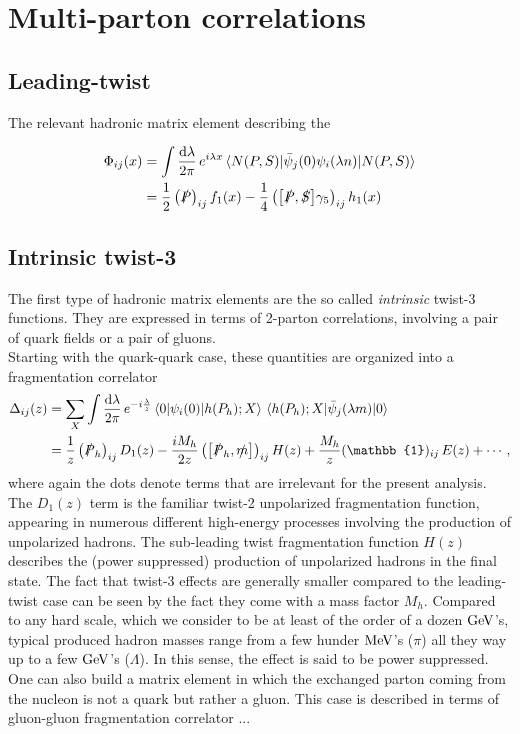 \section{Multi-parton correlations}

\subsection{Leading-twist }
The relevant hadronic matrix element describing the 


\begin{equation}
    \begin{aligned}
        \Phi_{ij}(x)&= \int\frac{\dd \lambda}{2\pi} \,e^{i\lambda x}\mel{N(P,S)}{\bar \psi_j(0) \psi_i(\lambda n)}{N(P,S)}\\
        &= \frac{1}{2}\left(\slashed{P}\right)_{ij} f_1(x)
        -\frac{1}{4} \left(\comm{\slashed{P}}{\slashed{S}}\gamma_5\right)_{ij} h_1(x)
    \end{aligned}
\end{equation}
\subsection{Intrinsic twist-3}
The first type of hadronic matrix elements are the so called \textit{intrinsic} twist-3 functions. They are expressed in terms of 2-parton correlations, involving a pair of quark fields or a pair of gluons. \\
Starting with the quark-quark case, these quantities are organized into a fragmentation correlator
\begin{equation}
    \begin{aligned}
        \Delta_{ij}(z)&= \sum_X\int\frac{\dd \lambda}{2\pi} \,e^{-i\frac{\lambda}{z}}\mel{0}{\psi_i(0)}{h(P_h);X}\mel{h(P_h);X}{\bar \psi_j(\lambda m)}{0}\\
        &= \frac{1}{z}\left(\slashed{P}_h\right)_{ij} D_1(z)-\frac{iM_h}{2z} \left(\comm{\slashed{P}_h}{\slashed{m}}\right)_{ij} H(z)+\frac{M_h}{z}(\mathbb{1})_{ij}\,E(z)+\cdots,
        \end{aligned}
\end{equation}
where again the dots denote terms that are irrelevant for the present analysis. The $D_1(z)$ term is the familiar twist-2 unpolarized fragmentation function, appearing in numerous different high-energy processes involving the production of unpolarized hadrons. The sub-leading twist fragmentation function $H(z)$ describes the (power suppressed) production of unpolarized hadrons in the final state. The fact that twist-3 effects are generally smaller compared to the leading-twist case can be seen by the fact they come with a mass factor $M_h$. Compared to any hard scale, which we consider to be at least of the order of a dozen $\rm GeV$'s, typical produced hadron masses range from a few hunder $\rm MeV$'s ($\pi$) all they way up to a few $\rm GeV$'s ($\Lambda$). In this sense, the effect is said to be power suppressed.\\
One can also build a matrix element in which the exchanged parton coming from the nucleon is not a quark but rather a gluon. This case is described in terms of gluon-gluon fragmentation correlator ...


